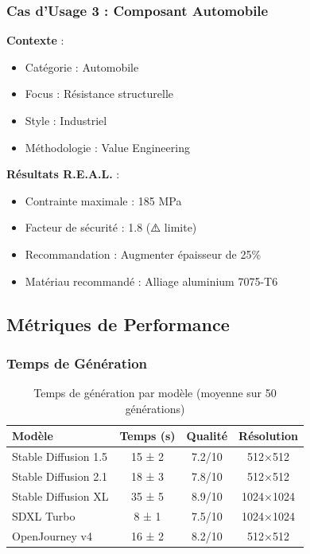\subsubsection{Cas d'Usage 3 : Composant Automobile}

\textbf{Contexte} :
\begin{itemize}[leftmargin=*]
    \item Catégorie : Automobile
    \item Focus : Résistance structurelle
    \item Style : Industriel
    \item Méthodologie : Value Engineering
\end{itemize}

\textbf{Résultats R.E.A.L.} :
\begin{itemize}[leftmargin=*]
    \item Contrainte maximale : 185 MPa
    \item Facteur de sécurité : 1.8 (⚠️ limite)
    \item Recommandation : Augmenter épaisseur de 25\%
    \item Matériau recommandé : Alliage aluminium 7075-T6
\end{itemize}

\subsection{Métriques de Performance}

\subsubsection{Temps de Génération}

\begin{table}[H]
\centering
\caption{Temps de génération par modèle (moyenne sur 50 générations)}
\label{tab:perf_models}
\begin{tabular}{@{}lccc@{}}
\toprule
\textbf{Modèle} & \textbf{Temps (s)} & \textbf{Qualité} & \textbf{Résolution} \\ 
\midrule
Stable Diffusion 1.5 & 15 ± 2 & 7.2/10 & 512×512 \\
Stable Diffusion 2.1 & 18 ± 3 & 7.8/10 & 512×512 \\
Stable Diffusion XL & 35 ± 5 & 8.9/10 & 1024×1024 \\
SDXL Turbo & 8 ± 1 & 7.5/10 & 1024×1024 \\
OpenJourney v4 & 16 ± 2 & 8.2/10 & 512×512 \\
\bottomrule
\end{tabular}
\end{table}


